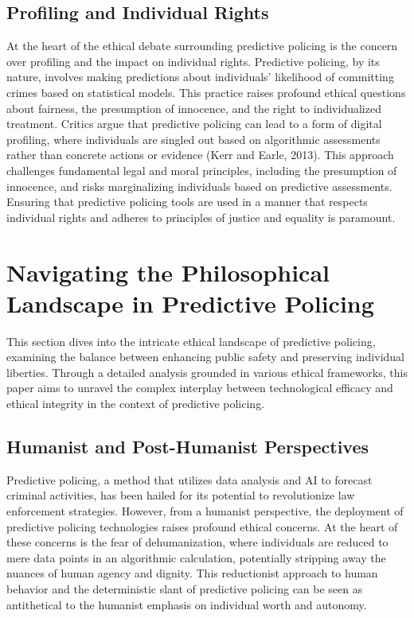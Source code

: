 \documentclass[man, noextraspace]{apa7} %
\begin{document}
\subsection{Profiling and Individual Rights}
At the heart of the ethical debate surrounding predictive policing is the concern over profiling and the impact on individual rights. Predictive policing, by its nature, involves making predictions about individuals' likelihood of committing crimes based on statistical models. This practice raises profound ethical questions about fairness, the presumption of innocence, and the right to individualized treatment. Critics argue that predictive policing can lead to a form of digital profiling, where individuals are singled out based on algorithmic assessments rather than concrete actions or evidence (Kerr and Earle, 2013). This approach challenges fundamental legal and moral principles, including the presumption of innocence, and risks marginalizing individuals based on predictive assessments. Ensuring that predictive policing tools are used in a manner that respects individual rights and adheres to principles of justice and equality is paramount. \newpage

\section{Navigating the Philosophical Landscape in Predictive Policing}
This section dives into the intricate ethical landscape of predictive policing, examining the balance between enhancing public safety and preserving individual liberties. Through a detailed analysis grounded in various ethical frameworks, this paper aims to unravel the complex interplay between technological efficacy and ethical integrity in the context of predictive policing.

\subsection{Humanist and Post-Humanist Perspectives}
Predictive policing, a method that utilizes data analysis and AI to forecast criminal activities, has been hailed for its potential to revolutionize law enforcement strategies. However, from a humanist perspective, the deployment of predictive policing technologies raises profound ethical concerns. At the heart of these concerns is the fear of dehumanization, where individuals are reduced to mere data points in an algorithmic calculation, potentially stripping away the nuances of human agency and dignity. This reductionist approach to human behavior and the deterministic slant of predictive policing can be seen as antithetical to the humanist emphasis on individual worth and autonomy.
\end{document}
